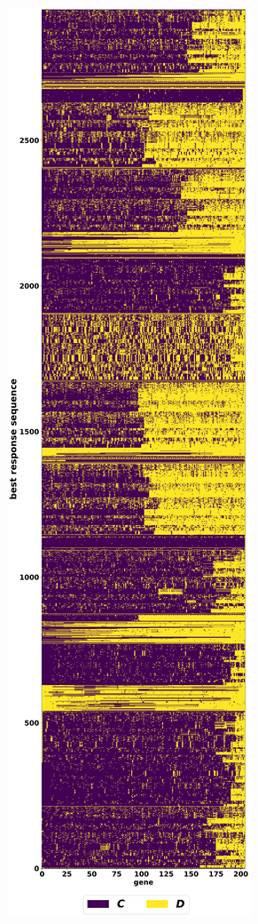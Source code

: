 \begin{figure}[!htbp]
    \begin{subfigure}{0.45\textwidth}
    \centering
    \includegraphics[width=.9\textwidth]{src/chapters/06/img/deterministic_best_responses.pdf}

\end{subfigure}
\end{figure}
